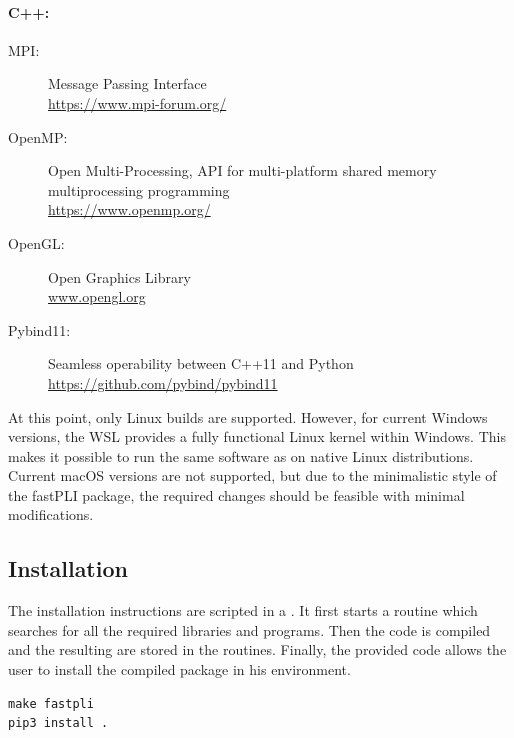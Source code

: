 \paragraph{C++:}
\begin{description}
\item[MPI:] Message Passing Interface \cite{message2015mpi}\\
\url{https://www.mpi-forum.org/}
\item[OpenMP:] Open Multi-Processing, API for multi-platform shared memory multiprocessing programming \cite{dagum1998openmp}\\
\url{https://www.openmp.org/}
\item[OpenGL:] Open Graphics Library \cite{khronos}\\
\url{www.opengl.org}
\item[Pybind11:] Seamless operability between C++11 and Python \cite{pybind11}\\ \url{https://github.com/pybind/pybind11}
\end{description}
%
%
At this point, only Linux builds are supported.
However, for current Windows versions, the \ac{WSL} provides a fully functional Linux kernel within Windows.
This makes it possible to run the same software as on native Linux distributions.
Current macOS versions are not supported, but due to the minimalistic style of the \ac{fastPLI} package, the required changes should be feasible with minimal modifications.
%
%
%
\subsection{Installation}
%
The installation instructions are scripted in a .
It first starts a  routine which searches for all the required libraries and programs.
Then the \cpp{} code is compiled and the resulting  are stored in the \python{} routines.
Finally, the provided code  allows the user to install the compiled package in his environment.
%
\begin{lstfloat}[!ht]
\lstset{style=common}
\begin{lstlisting}
make fastpli
pip3 install .
\end{lstlisting}
\end{lstfloat}
%
%
%

